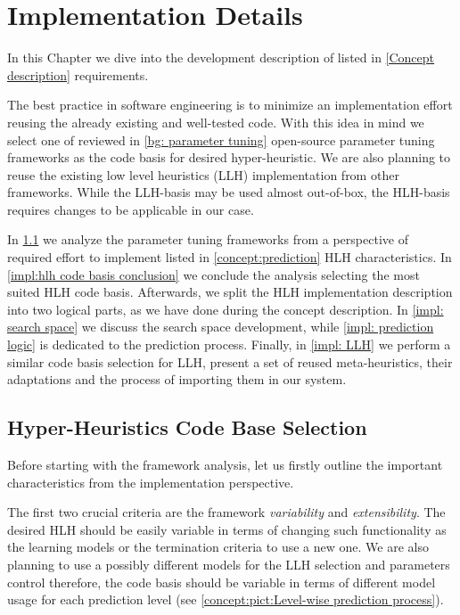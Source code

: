 \chapter{Implementation Details}\label{impl}
In this Chapter we dive into the development description of listed in \cref{Concept description} requirements.
 
The best practice in software engineering is to minimize an implementation effort reusing the already existing and well-tested code. With this idea in mind we select one of reviewed in \cref{bg: parameter tuning} open-source parameter tuning frameworks as the code basis for desired hyper-heuristic. We are also planning to reuse the existing low level heuristics (LLH) implementation from other frameworks. While the LLH-basis may be used almost out-of-box, the HLH-basis requires changes to be applicable in our case.

In \cref{impl:hlh code basis section} we analyze the parameter tuning frameworks from a perspective of required effort to implement listed in \cref{concept:prediction} HLH characteristics. In \cref{impl:hlh code basis conclusion} we conclude the analysis selecting the most suited HLH code basis. Afterwards, we split the HLH implementation description into two logical parts, as we have done during the concept description. In \cref{impl: search space} we discuss the search space development, while \cref{impl: prediction logic} is dedicated to the prediction process. Finally, in \cref{impl: LLH} we perform a similar code basis selection for LLH, present a set of reused meta-heuristics, their adaptations and the process of importing them in our system.


\section{Hyper-Heuristics Code Base Selection}\label{impl:hlh code basis section}
Before starting with the framework analysis, let us firstly outline the important characteristics from the implementation perspective.

The first two crucial criteria are the framework \emph{variability} and \emph{extensibility}. The desired HLH should be easily variable in terms of changing such functionality as the learning models or the termination criteria to use a new one. We are also planning to use a possibly different models for the LLH selection and parameters control therefore, the code basis should be variable in terms of different model usage for each prediction level (see \cref{concept:pict:Level-wise prediction process}).

